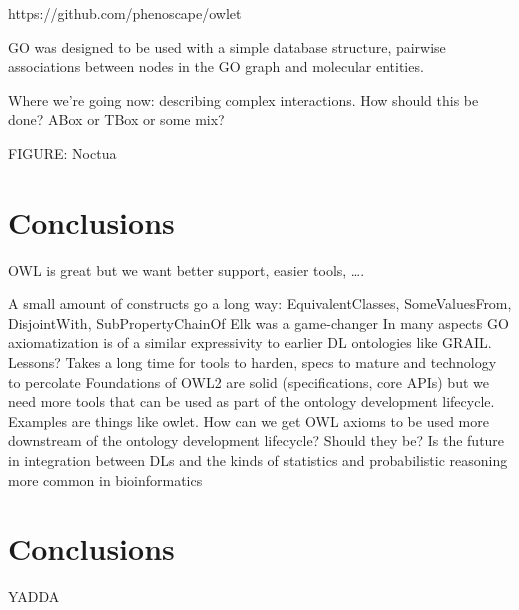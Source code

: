 \documentclass{llncs}
\begin{document}
https://github.com/phenoscape/owlet

GO was designed to be used with a simple database structure, pairwise associations between nodes in the GO graph and molecular entities. 

Where we’re going now: describing complex interactions. How should this be done? ABox or TBox or some mix? 

FIGURE: Noctua

\section{Conclusions}


OWL is great but we want better support, easier tools, ….

A small amount of constructs go a long way: EquivalentClasses, SomeValuesFrom, DisjointWith, SubProperty{Chain}Of
Elk was a game-changer
In many aspects GO axiomatization is of a similar expressivity to earlier DL ontologies like GRAIL. Lessons? Takes a long time for tools to harden, specs to mature and technology to percolate
Foundations of OWL2 are solid (specifications, core APIs) but we need more tools that can be used as part of the ontology development lifecycle. Examples are things like owlet.
How can we get OWL axioms to be used more downstream of the ontology development lifecycle? Should they be? Is the future in integration between DLs and the kinds of statistics and probabilistic reasoning more common in bioinformatics























\section{Conclusions}

YADDA



\end{document}
